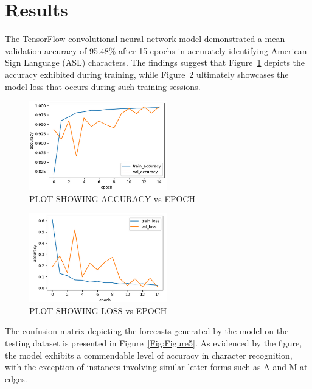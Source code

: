 \documentclass[conference]{IEEEtran}
\begin{document}
\section{Results}
The TensorFlow convolutional neural network model demonstrated a mean validation accuracy of 95.48\% after 15 epochs in accurately identifying American Sign Language (ASL) characters. The findings suggest that Figure~\ref{Fig:Figure3} depicts the accuracy exhibited during training, while Figure~\ref{Fig:Figure4} ultimately showcases the model loss that occurs during such training sessions.

\begin{figure}[t!]
\centering
\includegraphics[width=6cm]{Images/accuracy_plot.png}
\caption{PLOT SHOWING ACCURACY vs EPOCH}
\label{Fig:Figure3}
\end{figure}

\begin{figure}[t!]
\centering
\includegraphics[width=6cm]{Images/loss_plot.png}
\caption{PLOT SHOWING LOSS vs EPOCH}
\label{Fig:Figure4}
\end{figure}

The confusion matrix depicting the forecasts generated by the model on the testing dataset is presented in Figure~\ref{Fig:Figure5}. As evidenced by the figure, the model exhibits a commendable level of accuracy in character recognition, with the exception of instances involving similar letter forms such as A and M at edges.
\end{document}
